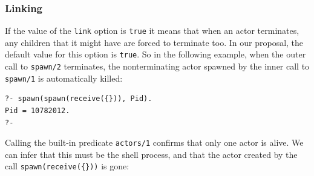 %
%
%
%

\subsubsection{Linking}

\noindent If the value of the \texttt{link} option is \texttt{true} it means that when an actor terminates, any children that it might have are forced to terminate too. In our proposal, the default value for this option is \texttt{true}. So in the following example, when the outer call to \texttt{spawn/2} terminates, the nonterminating actor spawned by the inner call to \texttt{spawn/1} is automatically killed: 

\begin{verbatim}
?- spawn(spawn(receive({})), Pid).
Pid = 10782012.
?-
\end{verbatim}

\noindent Calling the built-in predicate \texttt{actors/1} confirms that only one actor is alive. We can infer that this must be the shell process, and that the actor created by the call \texttt{spawn(receive(\{\}))} is gone:

